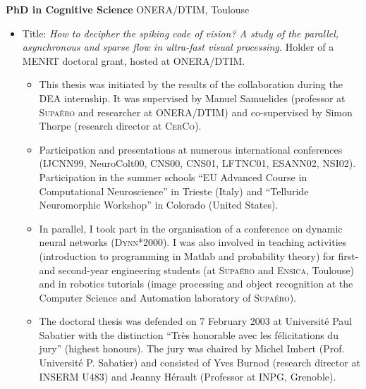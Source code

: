 \documentclass[10pt,english,a4paper,oneside]{article}%
\newcommand{\years}[1]{\marginpar{\textit{\scriptsize #1}}}
\begin{document}
\vspace*{.3cm}
	\textbf{PhD in Cognitive Science} ONERA/DTIM, Toulouse \hfill \years{\textbf{1999-2003}} \\
\vspace*{-.15in}
\begin{itemize}
\item[] Title: \emph{How to decipher the spiking code of vision? A study of the parallel, asynchronous and sparse flow in ultra-fast visual processing.}  Holder of a MENRT doctoral grant, hosted at ONERA/DTIM.
\begin{itemize}
		\item
		This thesis was initiated by the results of the collaboration during the DEA internship. It was supervised by Manuel Samuelides (professor at \textsc{Supaéro} and researcher at ONERA/DTIM) and co-supervised by Simon Thorpe (research director at \textsc{CerCo}).
		\item Participation and presentations at numerous international conferences (IJCNN99, NeuroColt00, CNS00, CNS01, LFTNC01, ESANN02, NSI02). Participation in the summer schools ``EU Advanced Course in Computational Neuroscience'' in Trieste (Italy) and ``Telluride Neuromorphic Workshop'' in Colorado (United States).
		\item
		In parallel, I took part in the organisation of a conference on dynamic neural networks (\textsc{Dynn}*2000). I was also involved in teaching activities (introduction to programming in Matlab and probability theory) for first- and second-year engineering students (at \textsc{Supaéro} and \textsc{Ensica}, Toulouse) and in robotics tutorials (image processing and object recognition at the Computer Science and Automation laboratory of \textsc{Supaéro}).
		\item
		The doctoral thesis was defended on 7 February 2003 at Université Paul Sabatier with the distinction ``Très honorable avec les félicitations du jury'' (highest honours). The jury was chaired by Michel Imbert (Prof. Université P. Sabatier) and consisted of Yves Burnod (research director at \textsc{INSERM} U483) and Jeanny Hérault (Professor at INPG, Grenoble).
	\end{itemize} %
\end{itemize} %
\end{document}
